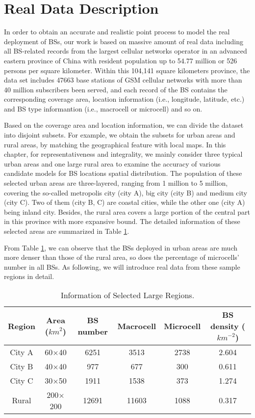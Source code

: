 \section{Real Data Description} \label{sec3-2}
In order to obtain an accurate and realistic point process to model the real deployment of BSs, our work is based on massive amount of real data including all BS-related records from the largest cellular networks operator in an advanced eastern province of China with resident population up to 54.77 million or 526 persons per square kilometer. Within this 104,141 square kilometers province, the data set includes 47663 base stations of GSM cellular networks with more than 40 million subscribers been served, and each record of the BS contains the corresponding coverage area, location information (i.e., longitude, latitude, etc.) and BS type informantion (i.e., macrocell or microcell) and so on.

Based on the coverage area and location information, we can divide the dataset into disjoint subsets. For example, we obtain the subsets for urban areas and rural areas, by matching the geographical feature with local maps. In this chapter, for representativeness and integrality, we mainly consider three typical urban areas and one large rural area to examine the accuracy of various candidate models for BS locations spatial distribution. The population of these selected urban areas are three-layered, ranging from 1 million to 5 million, covering the so-called metropolis city (city A), big city (city B) and medium city (city C). Two of them (city B, C) are coastal cities, while the other one (city A) being inland city. Besides, the rural area covers a large portion of the central part in this province with more expansive bound. The detailed information of these selected areas are summarized in Table \ref{RealDataInformation}.

From Table \ref{RealDataInformation}, we can observe that the BSs deployed in urban areas are much more denser than those of the rural area, so does the percentage of microcells' number in all BSs. As following, we will introduce real data from these sample regions in detail.

\begin{table}[!htb]
  \centering
  \caption{Information of Selected Large Regions.}
    \label{RealDataInformation}
    \begin{tabular}{cccccc}
    \toprule
    Region & Area (${km}^2$) & BS number & Macrocell & Microcell & BS density (${km}^{-2}$)\\
    \midrule
    City A & 60$\times$40 & 6251  & 3513  & 2738  & 2.604 \\
    City B & 40$\times$40 & 977   & 677   & 300   & 0.611 \\
    City C & 30$\times$50 & 1911  & 1538  & 373   & 1.274 \\
    Rural  & 200$\times$200 & 12691 & 11603 & 1088  & 0.317 \\
    \bottomrule
    \end{tabular}%
\end{table}%

